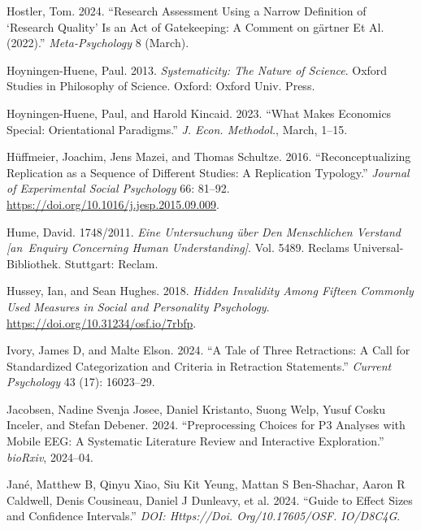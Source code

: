 \documentclass[
  letterpaper,
  DIV=11,
  numbers=noendperiod]{scrreprt}
\newlength{\cslhangindent}
\newenvironment{CSLReferences}[2] %
 {\begin{list}{}{%
  \setlength{\itemindent}{0pt}
  \setlength{\leftmargin}{0pt}
  \setlength{\parsep}{0pt}
  \ifodd #1
   \setlength{\leftmargin}{\cslhangindent}
   \setlength{\itemindent}{-1\cslhangindent}
  \fi
  \setlength{\itemsep}{#2\baselineskip}}}
 {\end{list}}
\begin{document}
\begin{CSLReferences}{1}{0}
Hostler, Tom. 2024. {``Research Assessment Using a Narrow Definition of
{`Research Quality'} Is an Act of Gatekeeping: A Comment on g{ä}rtner Et
Al. (2022).''} \emph{Meta-Psychology} 8 (March).

Hoyningen-Huene, Paul. 2013. \emph{Systematicity: The Nature of
Science}. Oxford Studies in Philosophy of Science. Oxford: {Oxford Univ.
Press}.

Hoyningen-Huene, Paul, and Harold Kincaid. 2023. {``What Makes Economics
Special: Orientational Paradigms.''} \emph{J. Econ. Methodol.}, March,
1--15.

Hüffmeier, Joachim, Jens Mazei, and Thomas Schultze. 2016.
{``Reconceptualizing Replication as a Sequence of Different Studies: A
Replication Typology.''} \emph{Journal of Experimental Social
Psychology} 66: 81--92.
\url{https://doi.org/10.1016/j.jesp.2015.09.009}.

Hume, David. 1748/2011. \emph{Eine Untersuchung {ü}ber Den Menschlichen
Verstand {[}an~Enquiry Concerning Human Understanding{]}}. Vol. 5489.
Reclams Universal-Bibliothek. Stuttgart: Reclam.

Hussey, Ian, and Sean Hughes. 2018. \emph{Hidden Invalidity Among
Fifteen Commonly Used Measures in Social and Personality Psychology}.
\url{https://doi.org/10.31234/osf.io/7rbfp}.

Ivory, James D, and Malte Elson. 2024. {``A Tale of Three Retractions: A
Call for Standardized Categorization and Criteria in Retraction
Statements.''} \emph{Current Psychology} 43 (17): 16023--29.

Jacobsen, Nadine Svenja Josee, Daniel Kristanto, Suong Welp, Yusuf Cosku
Inceler, and Stefan Debener. 2024. {``Preprocessing Choices for P3
Analyses with Mobile EEG: A Systematic Literature Review and Interactive
Exploration.''} \emph{bioRxiv}, 2024--04.

Jané, Matthew B, Qinyu Xiao, Siu Kit Yeung, Mattan S Ben-Shachar, Aaron
R Caldwell, Denis Cousineau, Daniel J Dunleavy, et al. 2024. {``Guide to
Effect Sizes and Confidence Intervals.''} \emph{DOI: Https://Doi.
Org/10.17605/OSF. IO/D8C4G}.


\end{CSLReferences}
\end{document}
